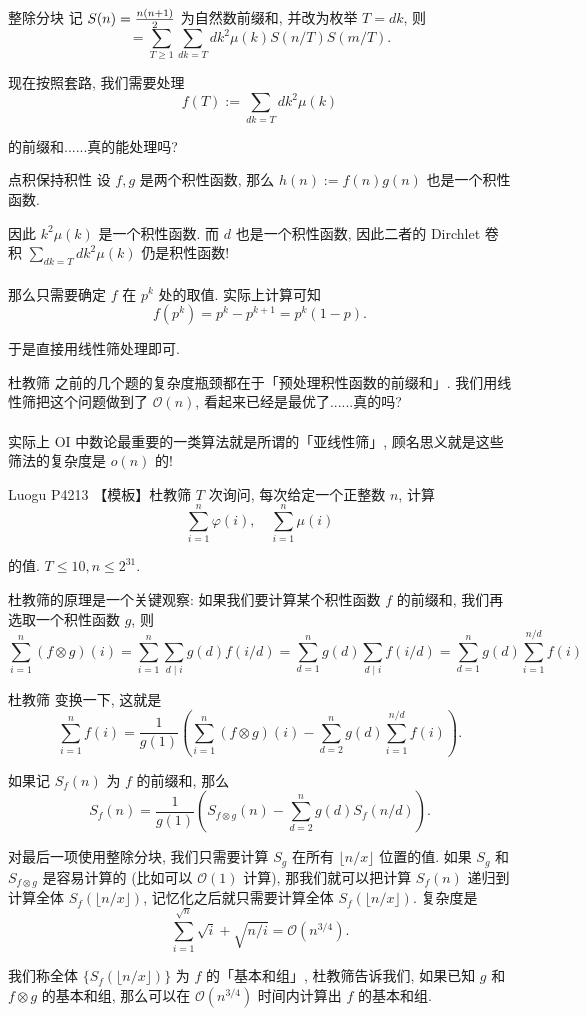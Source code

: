 \documentclass{beamer}
\newcommand{\nl}{\\\hspace*{\fill}\\}
\begin{document}
    \begin{frame}{整除分块}
        记 $S(n)={n(n+1)\over 2}$ 为自然数前缀和, 并改为枚举 $T=dk$, 则
        $$
        =\sum_{T\geq 1}\sum_{dk=T}dk^2\mu(k)S(n/T)S(m/T).
        $$

        现在按照套路, 我们需要处理
        $$
        f(T):=\sum_{dk=T}dk^2\mu(k)
        $$

        的前缀和......真的能处理吗?
        \pause
        \begin{block}{点积保持积性}
            设 $f,g$ 是两个积性函数, 那么 $h(n):=f(n)g(n)$ 也是一个积性函数.
        \end{block}
        因此 $k^2\mu(k)$ 是一个积性函数. 而 $d$ 也是一个积性函数, 因此二者的 Dirchlet 卷积 $\sum_{dk=T}dk^2\mu(k)$ 仍是积性函数!\nl
        那么只需要确定 $f$ 在 $p^k$ 处的取值. 实际上计算可知
        $$
        f(p^k)=p^k-p^{k+1}=p^k(1-p).
        $$

        于是直接用线性筛处理即可.
    \end{frame}

    \begin{frame}{杜教筛}
        之前的几个题的复杂度瓶颈都在于「预处理积性函数的前缀和」. 我们用线性筛把这个问题做到了 $\mathcal O(n)$, 看起来已经是最优了......真的吗?\nl
        \pause
        实际上 OI 中数论最重要的一类算法就是所谓的「亚线性筛」, 顾名思义就是这些筛法的复杂度是 $o(n)$ 的!
        \begin{block}{Luogu P4213 【模板】杜教筛}
            $T$ 次询问, 每次给定一个正整数 $n$, 计算
            $$
            \sum_{i=1}^n\varphi(i),\quad\sum_{i=1}^n\mu(i)
            $$

            的值. $T\leq 10, n\leq 2^{31}$.
        \end{block}
        \pause
        杜教筛的原理是一个关键观察: 如果我们要计算某个积性函数 $f$ 的前缀和, 我们再选取一个积性函数 $g$, 则
        $$
        \sum_{i=1}^n(f\otimes g)(i)=\sum_{i=1}^n\sum_{d\mid i}g(d)f(i/d)=\sum_{d=1}^ng(d)\sum_{d\mid i}f(i/d)=\sum_{d=1}^ng(d)\sum_{i=1}^{n/d}f(i)
        $$
    \end{frame}

    \begin{frame}{杜教筛}
        变换一下, 这就是
        $$
        \sum_{i=1}^n f(i)=\frac 1{g(1)}\left(\sum_{i=1}^n (f\otimes g)(i)-\sum_{d=2}^ng(d)\sum_{i=1}^{n/d}f(i)\right).
        $$

        如果记 $S_f(n)$ 为 $f$ 的前缀和, 那么
        $$
        S_f(n)=\frac 1{g(1)}\left(S_{f\otimes g}(n)-\sum_{d=2}^ng(d)S_f(n/d)\right).
        $$

        对最后一项使用整除分块, 我们只需要计算 $S_g$ 在所有 $\lfloor n/x\rfloor$ 位置的值. 如果 $S_g$ 和 $S_{f\otimes g}$ 是容易计算的 (比如可以 $\mathcal O(1)$ 计算), 那我们就可以把计算 $S_f(n)$ 递归到计算全体 $S_f(\lfloor n/x\rfloor)$, 记忆化之后就只需要计算全体 $S_f(\lfloor n/x\rfloor)$. 复杂度是
        $$
        \sum_{i=1}^{\sqrt n}\sqrt i+\sqrt{n/i}=\mathcal O(n^{3/4}).
        $$

        我们称全体 $\{S_f(\lfloor n/x\rfloor)\}$ 为 $f$ 的「基本和组」, 杜教筛告诉我们, 如果已知 $g$ 和 $f\otimes g$ 的基本和组, 那么可以在 $\mathcal O(n^{3/4})$ 时间内计算出 $f$ 的基本和组.
    \end{frame}
\end{document}
